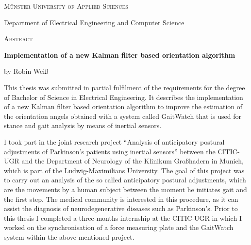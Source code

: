 \thispagestyle{plain}
  \null\vfil
  
\begin{center}
    \setlength{\parskip}{0pt}
    {\large \textsc{Münster University of Applied Sciences} \par}
    \medskip
    {\normalsize Department of Electrical Engineering and Computer Science \par}
    \bigskip
    {\huge{\textsc{Abstract}} \par}
    \bigskip
    {\normalsize\bf Implementation of a new Kalman filter based orientation algorithm \par}
    \medskip
    {\normalsize by Robin Weiß \par}
    \bigskip
\end{center}

\noindent  
This thesis was submitted in partial fulfilment of the requirements for the degree of Bachelor of Science in Electrical Engineering. It describes the implementation of a new Kalman filter based orientation algorithm to improve the estimation of the orientation angels obtained with a system called GaitWatch that is used for stance and gait analysis by means of inertial sensors.

I took part in the joint research project “Analysis of anticipatory postural adjustments of Parkinson’s patients using inertial sensors” between the \gls{CITIC-UGR} and the Department of Neurology of the Klinikum Großhadern in Munich, which is part of the Ludwig-Maximilians University. The goal of this project was to carry out an analysis of the so called anticipatory postural adjustments, which are the movements by a human subject between the moment he initiates gait and the first step. The medical community is interested in this procedure, as it can assist the diagnosis of neurodegenerative diseases such as Parkinson's. Prior to this thesis I completed a three-months internship at the \gls{CITIC-UGR} in which I worked on the synchronisation of a force measuring plate and the GaitWatch system within the above-mentioned project.


